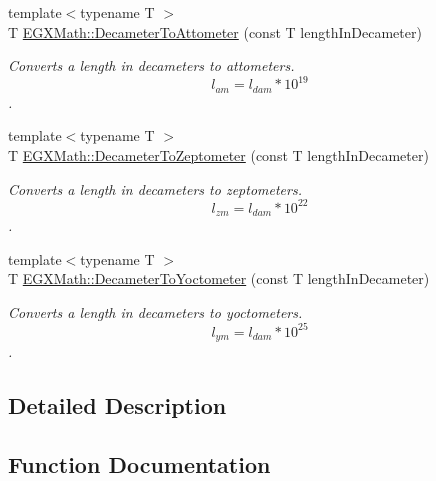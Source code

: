 \begin{DoxyCompactItemize}
{\footnotesize template$<$typename T $>$ }\\T \mbox{\hyperlink{group___e_g_x_math-_conversions-_length_conversions-_decameter-_s_i_ga580471565f6ffb83166a8b21b2a3a01e}{E\+G\+X\+Math\+::\+Decameter\+To\+Attometer}} (const T length\+In\+Decameter)
\begin{DoxyCompactList}\small\item\em Converts a length in decameters to attometers. \[ l_{am}=l_{dam} * 10^{19} \]. \end{DoxyCompactList}\item 
{\footnotesize template$<$typename T $>$ }\\T \mbox{\hyperlink{group___e_g_x_math-_conversions-_length_conversions-_decameter-_s_i_gaa5ec7101e385d972cd3175fab39fd2c6}{E\+G\+X\+Math\+::\+Decameter\+To\+Zeptometer}} (const T length\+In\+Decameter)
\begin{DoxyCompactList}\small\item\em Converts a length in decameters to zeptometers. \[ l_{zm}=l_{dam} * 10^{22} \]. \end{DoxyCompactList}\item 
{\footnotesize template$<$typename T $>$ }\\T \mbox{\hyperlink{group___e_g_x_math-_conversions-_length_conversions-_decameter-_s_i_ga1e90c34b56ee230eec4a3e00a3fedbde}{E\+G\+X\+Math\+::\+Decameter\+To\+Yoctometer}} (const T length\+In\+Decameter)
\begin{DoxyCompactList}\small\item\em Converts a length in decameters to yoctometers. \[ l_{ym}=l_{dam} * 10^{25} \]. \end{DoxyCompactList}\end{DoxyCompactItemize}


\subsection{Detailed Description}


\subsection{Function Documentation}
\mbox{\label{group___e_g_x_math-_conversions-_length_conversions-_decameter-_s_i_ga580471565f6ffb83166a8b21b2a3a01e}} 
